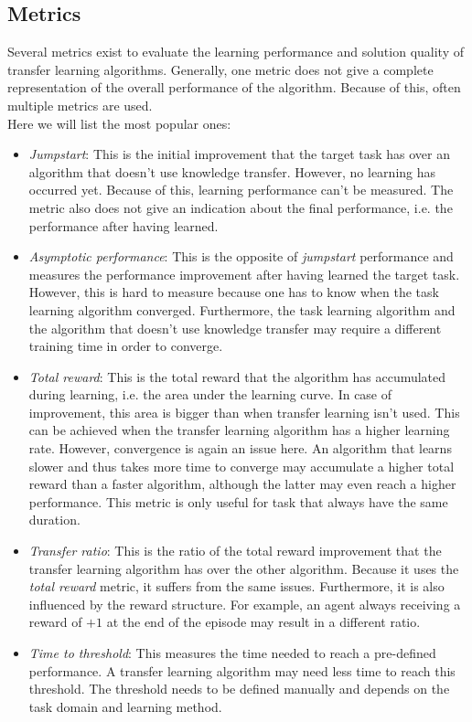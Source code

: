 \subsection{Metrics}
\label{sub:tl_metrics}
Several metrics exist to evaluate the learning performance and solution quality of transfer learning algorithms. Generally, one metric does not give a complete representation of the overall performance of the algorithm. Because of this, often multiple metrics are used.\\
Here we will list the most popular ones:
\begin{itemize}
    \item \textit{Jumpstart}: This is the initial improvement that the target task has over an algorithm that doesn't use knowledge transfer. However, no learning has occurred yet. Because of this, learning performance can't be measured. The metric also does not give an indication about the final performance, i.e. the performance after having learned.
    \item \textit{Asymptotic performance}: This is the opposite of \textit{jumpstart} performance and measures the performance improvement after having learned the target task. However, this is hard to measure because one has to know when the task learning algorithm converged. Furthermore, the task learning algorithm and the algorithm that doesn't use knowledge transfer may require a different training time in order to converge.
    \item \textit{Total reward}: This is the total reward that the algorithm has accumulated during learning, i.e. the area under the learning curve. In case of improvement, this area is bigger than when transfer learning isn't used. This can be achieved when the transfer learning algorithm has a higher learning rate.
    However, convergence is again an issue here. An algorithm that learns slower and thus takes more time to converge may accumulate a higher total reward than a faster algorithm, although the latter may even reach a higher performance. This metric is only useful for task that always have the same duration.
    \item \textit{Transfer ratio}: This is the ratio of the total reward improvement that the transfer learning algorithm has over the other algorithm. Because it uses the \textit{total reward} metric, it suffers from the same issues. Furthermore, it is also influenced by the reward structure. For example, an agent always receiving a reward of $+1$ at the end of the episode may result in a different ratio.
    \item \textit{Time to threshold}: This measures the time needed to reach a pre-defined performance. A transfer learning algorithm may need less time to reach this threshold. The threshold needs to be defined manually and depends on the task domain and learning method.
\end{itemize}
